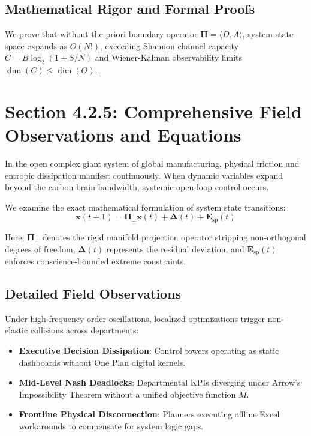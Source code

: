 \documentclass[12pt,a4paper,oneside]{book}
\begin{document}
\subsection*{Mathematical Rigor and Formal Proofs}
We prove that without the priori boundary operator $\mathbf{\Pi} = \langle D, A \rangle$, system state space expands as $O(N!)$, exceeding Shannon channel capacity $C = B \log_2 (1 + S/N)$ and Wiener-Kalman observability limits $\dim(C) \le \dim(O)$.
\clearpage
\section{Section 4.2.5: Comprehensive Field Observations and Equations}

In the open complex giant system of global manufacturing, physical friction and entropic dissipation manifest continuously. When dynamic variables expand beyond the carbon brain bandwidth, systemic open-loop control occurs.

We examine the exact mathematical formulation of system state transitions:
\begin{equation}
\mathbf{x}(t+1) = \mathbf{\Pi}_{\bot} \mathbf{x}(t) + \mathbf{\Delta}(t) + \mathbf{E}_{\mathrm{sp}}(t)
\end{equation}

Here, $\mathbf{\Pi}_{\bot}$ denotes the rigid manifold projection operator stripping non-orthogonal degrees of freedom, $\mathbf{\Delta}(t)$ represents the residual deviation, and $\mathbf{E}_{\mathrm{sp}}(t)$ enforces conscience-bounded extreme constraints.

\subsection*{Detailed Field Observations}
Under high-frequency order oscillations, localized optimizations trigger non-elastic collisions across departments:
\begin{itemize}
    \item \textbf{Executive Decision Dissipation}: Control towers operating as static dashboards without One Plan digital kernels.
    \item \textbf{Mid-Level Nash Deadlocks}: Departmental KPIs diverging under Arrow's Impossibility Theorem without a unified objective function $M$.
    \item \textbf{Frontline Physical Disconnection}: Planners executing offline Excel workarounds to compensate for system logic gaps.
\end{itemize}
\end{document}
